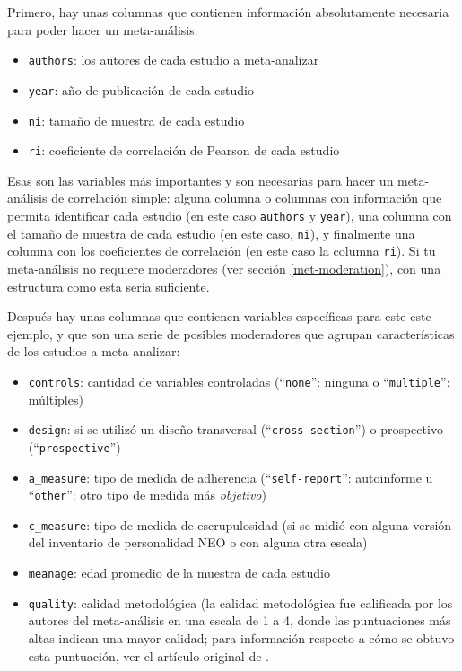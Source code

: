 \documentclass[
  bookmarksnumbered]{article}
\begin{document}
Primero, hay unas columnas que contienen información absolutamente necesaria para poder hacer un meta-análisis:

\begin{itemize}
\item
  \texttt{authors}: los autores de cada estudio a meta-analizar
\item
  \texttt{year}: año de publicación de cada estudio
\item
  \texttt{ni}: tamaño de muestra de cada estudio
\item
  \texttt{ri}: coeficiente de correlación de Pearson de cada estudio
\end{itemize}

Esas son las variables más importantes y son necesarias para hacer un meta-análisis de correlación simple: alguna columna o columnas con información que permita identificar cada estudio (en este caso \texttt{authors} y \texttt{year}), una columna con el tamaño de muestra de cada estudio (en este caso, \texttt{ni}), y finalmente una columna con los coeficientes de correlación (en este caso la columna \texttt{ri}). Si tu meta-análisis no requiere moderadores (ver sección \ref{met-moderation}), con una estructura como esta sería suficiente.

Después hay unas columnas que contienen variables específicas para este este ejemplo, y que son una serie de posibles moderadores que agrupan características de los estudios a meta-analizar:

\begin{itemize}
\item
  \texttt{controls}: cantidad de variables controladas (``\texttt{none}'': ninguna o ``\texttt{multiple}'': múltiples)
\item
  \texttt{design}: si se utilizó un diseño transversal (``\texttt{cross-section}'') o prospectivo (``\texttt{prospective}'') \autocite[para más información acerca de estos tipos de diseño, ver por ejemplo][]{Manterola2019}
\item
  \texttt{a\_measure}: tipo de medida de adherencia (``\texttt{self-report}'': autoinforme u ``\texttt{other}'': otro tipo de medida más \emph{objetivo})
\item
  \texttt{c\_measure}: tipo de medida de escrupulosidad (si se midió con alguna versión del inventario de personalidad NEO o con alguna otra escala)
\item
  \texttt{meanage}: edad promedio de la muestra de cada estudio
\item
  \texttt{quality}: calidad metodológica (la calidad metodológica fue calificada por los autores del meta-análisis en una escala de 1 a 4, donde las puntuaciones más altas indican una mayor calidad; para información respecto a cómo se obtuvo esta puntuación, ver el artículo original de \textcite{molloy2014}.
\end{itemize}
\end{document}
